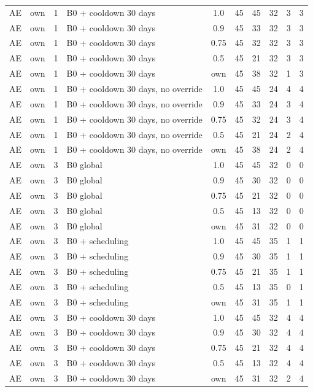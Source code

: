 \documentclass[10pt,onecolumn,letterpaper]{article}
\begin{document}
\begin{longtable}{lllp{4.4cm}cccccc}
AE & own & 1 & B0 + cooldown 30 days & 1.0 & 45 & 45 & 32 & 3 & 3 \\
AE & own & 1 & B0 + cooldown 30 days & 0.9 & 45 & 33 & 32 & 3 & 3 \\
AE & own & 1 & B0 + cooldown 30 days & 0.75 & 45 & 32 & 32 & 3 & 3 \\
AE & own & 1 & B0 + cooldown 30 days & 0.5 & 45 & 21 & 32 & 3 & 3 \\
AE & own & 1 & B0 + cooldown 30 days & own & 45 & 38 & 32 & 1 & 3 \\
AE & own & 1 & B0 + cooldown 30 days, no override & 1.0 & 45 & 45 & 24 & 4 & 4 \\
AE & own & 1 & B0 + cooldown 30 days, no override & 0.9 & 45 & 33 & 24 & 3 & 4 \\
AE & own & 1 & B0 + cooldown 30 days, no override & 0.75 & 45 & 32 & 24 & 3 & 4 \\
AE & own & 1 & B0 + cooldown 30 days, no override & 0.5 & 45 & 21 & 24 & 2 & 4 \\
AE & own & 1 & B0 + cooldown 30 days, no override & own & 45 & 38 & 24 & 2 & 4 \\
AE & own & 3 & B0 global & 1.0 & 45 & 45 & 32 & 0 & 0 \\
AE & own & 3 & B0 global & 0.9 & 45 & 30 & 32 & 0 & 0 \\
AE & own & 3 & B0 global & 0.75 & 45 & 21 & 32 & 0 & 0 \\
AE & own & 3 & B0 global & 0.5 & 45 & 13 & 32 & 0 & 0 \\
AE & own & 3 & B0 global & own & 45 & 31 & 32 & 0 & 0 \\
AE & own & 3 & B0 + scheduling & 1.0 & 45 & 45 & 35 & 1 & 1 \\
AE & own & 3 & B0 + scheduling & 0.9 & 45 & 30 & 35 & 1 & 1 \\
AE & own & 3 & B0 + scheduling & 0.75 & 45 & 21 & 35 & 1 & 1 \\
AE & own & 3 & B0 + scheduling & 0.5 & 45 & 13 & 35 & 0 & 1 \\
AE & own & 3 & B0 + scheduling & own & 45 & 31 & 35 & 1 & 1 \\
AE & own & 3 & B0 + cooldown 30 days & 1.0 & 45 & 45 & 32 & 4 & 4 \\
AE & own & 3 & B0 + cooldown 30 days & 0.9 & 45 & 30 & 32 & 4 & 4 \\
AE & own & 3 & B0 + cooldown 30 days & 0.75 & 45 & 21 & 32 & 4 & 4 \\
AE & own & 3 & B0 + cooldown 30 days & 0.5 & 45 & 13 & 32 & 4 & 4 \\
AE & own & 3 & B0 + cooldown 30 days & own & 45 & 31 & 32 & 2 & 4 \\

\end{longtable}
\end{document}
